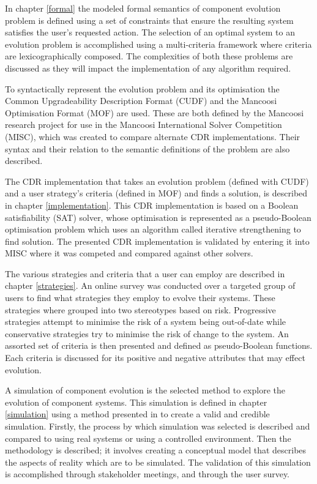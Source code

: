 In chapter \ref{formal} the modeled formal semantics of component evolution problem is defined using a set of constraints that ensure the resulting system satisfies the user's requested action.
The selection of an optimal system to an evolution problem is accomplished using a multi-criteria framework where criteria are lexicographically composed.
The complexities of both these problems are discussed as they will impact the implementation of any algorithm required.

To syntactically represent the evolution problem and its optimisation the Common Upgradeability Description Format (CUDF) \citep{treinen2009common} and the Mancoosi Optimisation Format (MOF) are used.
These are both defined by the Mancoosi research project for use in the Mancoosi International Solver Competition (MISC), 
which was created to compare alternate CDR implementations.
Their syntax and their relation to the semantic definitions of the problem are also described.

The CDR implementation that takes an evolution problem (defined with CUDF) and a user strategy's criteria (defined in MOF) and finds a solution, is described in chapter \ref{implementation}.
This CDR implementation is based on a Boolean satisfiability (SAT) solver, 
whose optimisation is represented as a pseudo-Boolean optimisation problem which uses an algorithm called iterative strengthening to find solution.
The presented CDR implementation is validated by entering it into MISC where it was competed and compared against other solvers.

The various strategies and criteria that a user can employ are described in chapter \ref{strategies}.
An online survey was conducted over a targeted group of users to find what strategies they employ to evolve their systems.
These strategies where grouped into two stereotypes based on risk.
Progressive strategies attempt to minimise the risk of a system being out-of-date while conservative strategies try to minimise the risk of change to the system.
An assorted set of criteria is then presented and defined as pseudo-Boolean functions.
Each criteria is discussed for its positive and negative attributes that may effect evolution.

A simulation of component evolution is the selected method to explore the evolution of component systems.
This simulation is defined in chapter \ref{simulation} using a method presented in \citep{Law2005} to create a valid and credible simulation.
Firstly, the process by which simulation was selected is described and compared to using real systems or using a controlled environment.
Then the methodology is described; it involves creating a conceptual model that describes the aspects of reality which are to be simulated.
The validation of this simulation is accomplished through stakeholder meetings, and through the user survey.

